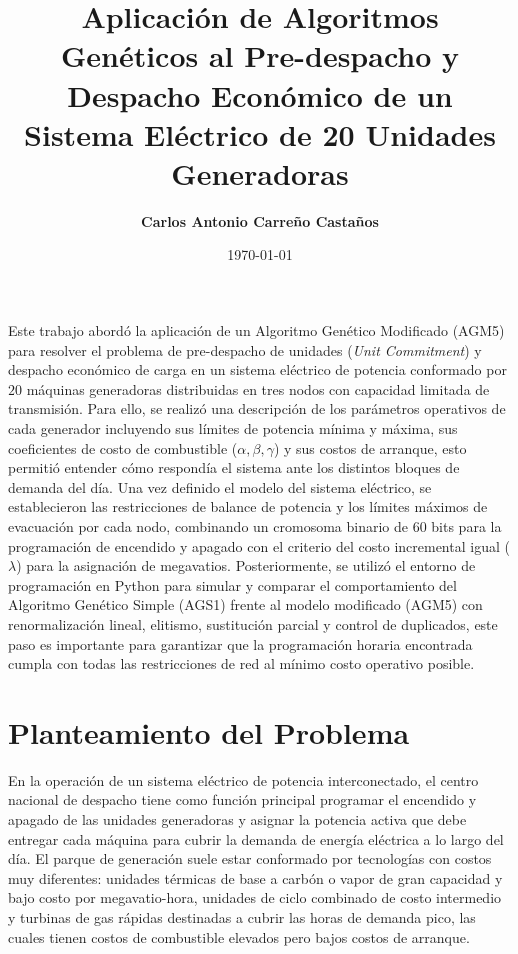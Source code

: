 \documentclass[11pt,letterpaper]{article}
\title{\textbf{Aplicación de Algoritmos Genéticos al Pre-despacho y Despacho Económico de un Sistema Eléctrico de 20 Unidades Generadoras}}
\author{\textbf{Carlos Antonio Carreño Castaños}}
\date{\today}
\begin{document}
\maketitle

\noindent Este trabajo abordó la aplicación de un Algoritmo Genético Modificado (AGM5) para resolver el problema de pre-despacho de unidades (\textit{Unit Commitment}) y despacho económico de carga en un sistema eléctrico de potencia conformado por $20$ máquinas generadoras distribuidas en tres nodos con capacidad limitada de transmisión. Para ello, se realizó una descripción de los parámetros operativos de cada generador incluyendo sus límites de potencia mínima y máxima, sus coeficientes de costo de combustible ($\alpha, \beta, \gamma$) y sus costos de arranque, esto permitió entender cómo respondía el sistema ante los distintos bloques de demanda del día. Una vez definido el modelo del sistema eléctrico, se establecieron las restricciones de balance de potencia y los límites máximos de evacuación por cada nodo, combinando un cromosoma binario de $60$ bits para la programación de encendido y apagado con el criterio del costo incremental igual ($\lambda$) para la asignación de megavatios. Posteriormente, se utilizó el entorno de programación en Python para simular y comparar el comportamiento del Algoritmo Genético Simple (AGS1) frente al modelo modificado (AGM5) con renormalización lineal, elitismo, sustitución parcial y control de duplicados, este paso es importante para garantizar que la programación horaria encontrada cumpla con todas las restricciones de red al mínimo costo operativo posible.

\section{Planteamiento del Problema}

En la operación de un sistema eléctrico de potencia interconectado, el centro nacional de despacho tiene como función principal programar el encendido y apagado de las unidades generadoras y asignar la potencia activa que debe entregar cada máquina para cubrir la demanda de energía eléctrica a lo largo del día. El parque de generación suele estar conformado por tecnologías con costos muy diferentes: unidades térmicas de base a carbón o vapor de gran capacidad y bajo costo por megavatio-hora, unidades de ciclo combinado de costo intermedio y turbinas de gas rápidas destinadas a cubrir las horas de demanda pico, las cuales tienen costos de combustible elevados pero bajos costos de arranque.
\end{document}
